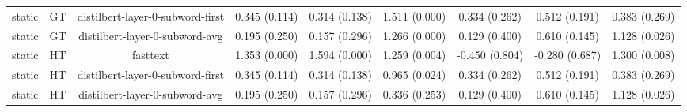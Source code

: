 \begin{sidewaystable}[htb]
\begin{tabular}{@{}ccccccccc@{}}
        static & GT & distilbert-layer-0-subword-first & 0.345 (0.114) & 0.314 (0.138) & 1.511 (0.000) & 0.334 (0.262) & 0.512 (0.191) & 0.383 (0.269) \\
        static & GT & distilbert-layer-0-subword-avg & 0.195 (0.250) & 0.157 (0.296) & 1.266 (0.000) & 0.129 (0.400) & 0.610 (0.145) & 1.128 (0.026) \\
        static & HT & fasttext & 1.353 (0.000) & 1.594 (0.000) & 1.259 (0.004) & -0.450 (0.804) & -0.280 (0.687) & 1.300 (0.008) \\
        static & HT & distilbert-layer-0-subword-first & 0.345 (0.114) & 0.314 (0.138) & 0.965 (0.024) & 0.334 (0.262) & 0.512 (0.191) & 0.383 (0.269) \\
        static & HT & distilbert-layer-0-subword-avg & 0.195 (0.250) & 0.157 (0.296) & 0.336 (0.253) & 0.129 (0.400) & 0.610 (0.145) & 1.128 (0.026) \\
        \bottomrule
    \end{tabular}
\end{sidewaystable}